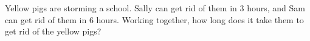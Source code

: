Yellow pigs are storming a school. Sally can get rid of them in $3$ hours, and Sam can get rid of them in $6$ hours. Working together, how long does it take them to get rid of the yellow pigs?
